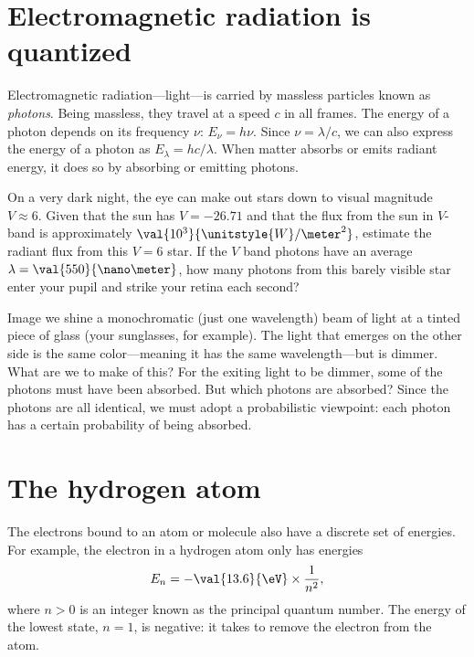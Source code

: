 
\section{Electromagnetic radiation is quantized}

Electromagnetic radiation---light---is carried by massless particles known as \emph{photons}. Being massless, they travel at a speed $c$ in all frames.  The energy of a photon depends on its frequency $\nu$: $E_{\nu} = h\nu$. Since $\nu = \lambda/c$, we can also express the energy of a photon as $E_{\lambda} = hc/\lambda$. When matter absorbs or emits radiant energy, it does so by absorbing or emitting photons.

\begin{exercisebox}
On a very dark night, the eye can make out stars down to visual magnitude $V\approx 6$. Given that the sun has $V=-26.71$ and that the flux from the sun in $V$-band is approximately $\val{10^{3}}{\unitstyle{W}/\meter^{2}}$, estimate the radiant flux from this $V=6$ star.  If the $V$ band photons have an average $\lambda = \val{550}{\nano\meter}$, how many photons from this barely visible star enter your pupil and strike your retina each second?
\end{exercisebox}

Image we shine a monochromatic (just one wavelength) beam of light at a tinted piece of glass (your sunglasses, for example).  The light that emerges on the other side is the same color---meaning it has the same wavelength---but is dimmer. What are we to make of this? For the exiting light to be dimmer, some of the photons must have been absorbed. But which photons are absorbed? Since the photons are all identical, we must adopt a probabilistic viewpoint: each photon has a certain probability of being absorbed.

\section{The hydrogen atom}

The electrons bound to an atom or molecule also have a discrete set of energies. For example, the electron in a hydrogen atom only has energies
\begin{equation}\label{e.H-levels}
	E_{n} = -\val{13.6}{\eV}\times \frac{1}{n^{2}},
\end{equation}
where $n > 0$ is an integer known as the principal quantum number.  The energy of the lowest state, $n=1$, is negative: it takes  to remove the electron from the atom.

